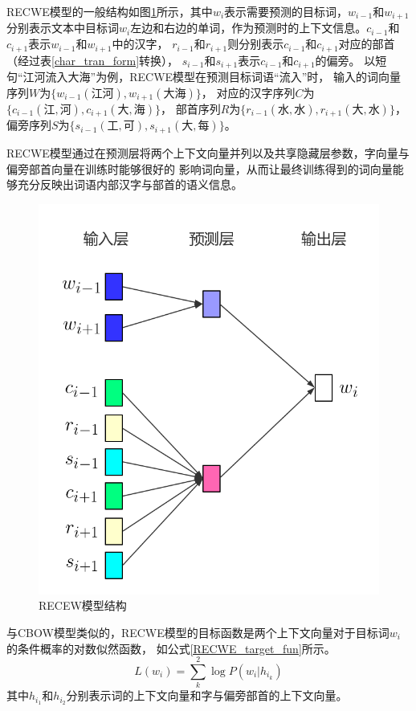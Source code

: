 RECWE模型的一般结构如图\ref{RECWE}所示，其中$w_i$表示需要预测的目标词，$w_{i-1}$和$w_{i+1}$
分别表示文本中目标词$w_i$左边和右边的单词，作为预测时的上下文信息。$c_{i-1}$和$c_{i+1}$表示$w_{i-1}$和$w_{i+1}$中的汉字，
$r_{i-1}$和$r_{i+1}$则分别表示$c_{i-1}$和$c_{i+1}$对应的部首（经过表\ref{char_tran_form}转换），
$s_{i-1}$和$s_{i+1}$表示$c_{i-1}$和$c_{i+1}$的偏旁。
以短句“江河流入大海”为例，RECWE模型在预测目标词语“流入”时，
输入的词向量序列$W$为$\{w_{i-1}(\mbox{江河}),w_{i+1}(\mbox{大海})\}$，
对应的汉字序列$C$为$\{c_{i-1}(\mbox{江},\mbox{河}),c_{i+1}(\mbox{大},\mbox{海})\}$，
部首序列$R$为$\{r_{i-1}(\mbox{水},\mbox{水}),r_{i+1}(\mbox{大},\mbox{水})\}$，
偏旁序列$S$为$\{s_{i-1}(\mbox{工},\mbox{可}),s_{i+1}(\mbox{大},\mbox{每})\}$。

RECWE模型通过在预测层将两个上下文向量并列以及共享隐藏层参数，字向量与偏旁部首向量在训练时能够很好的
影响词向量，从而让最终训练得到的词向量能够充分反映出词语内部汉字与部首的语义信息。
\begin{figure}[h]
    \includegraphics[scale=0.4]{picture/RECWE.png}
    \caption{RECEW模型结构}
    \label{RECWE}
\end{figure}

与CBOW模型类似的，RECWE模型的目标函数是两个上下文向量对于目标词$w_i$的条件概率的对数似然函数，
如公式\ref{RECWE_target_fun}所示。
\begin{equation}
    L\left ( w_i \right )= \sum_{k}^{2}\log P\left ( w_i | h_{i_k} \right )
    \label{RECWE_target_fun}
\end{equation}
其中$h_{i_1}$和$h_{i_2}$分别表示词的上下文向量和字与偏旁部首的上下文向量。

